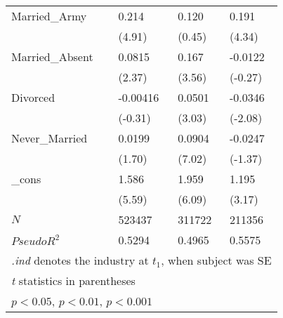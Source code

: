 \begin{longtable}{p{3 cm} p{2 cm} p{2 cm} p{2 cm}}
Married\_Army &    0.214\sym{***}&    0.120  &    0.191\sym{***}\\
          &   (4.91)   &   (0.45)  &   (4.34)         \\

Married\_Absent &   0.0815\sym{*}  &    0.167\sym{***}&  -0.0122         \\
          &   (2.37)         &   (3.56)         &  (-0.27)         \\

Divorced & -0.00416         &   0.0501\sym{**} &  -0.0346\sym{*}  \\
          &  (-0.31)         &   (3.03)         &  (-2.08)         \\

Never\_Married &   0.0199         &   0.0904\sym{***}&  -0.0247         \\
          &   (1.70)         &   (7.02)         &  (-1.37)         \\

\_cons    &    1.586\sym{***}&    1.959\sym{***}&    1.195\sym{**} \\
          &   (5.59)         &   (6.09)         &   (3.17)         \\
\hline
\(N\)     &   523437         &   311722         &   211356         \\
\(Pseudo R^{2}\) & 0.5294   &  0.4965      & 0.5575  \\
\hline\hline
\multicolumn{4}{l}{\footnotesize \textit{.ind} denotes the industry at $t_1$, when subject was SE}\\
\multicolumn{4}{l}{\footnotesize \textit{t} statistics in parentheses}\\
\multicolumn{4}{l}{\footnotesize \sym{*} \(p<0.05\), \sym{**} \(p<0.01\), \sym{***} \(p<0.001\)}\\
\end{longtable} 
\bodyspacing
